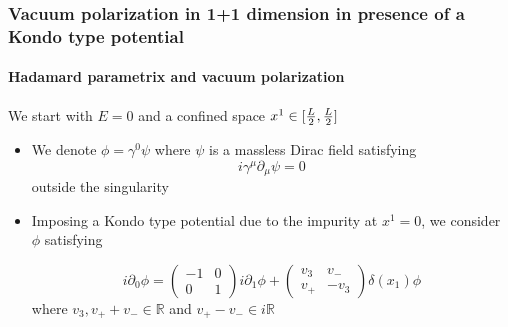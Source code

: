 \documentclass[french]{beamer}
\begin{document}
\begin{frame}[shrink=10]
\frametitle{Vacuum polarization in 1+1 dimension in presence of a Kondo type potential}
\framesubtitle{Hadamard parametrix and vacuum polarization}

We start with $E = 0$ and a confined space $x^1 \in [\-\frac L 2 , \frac L 2]$
\begin{itemize}
\item We denote $\phi = \gamma^0\psi$ where $\psi$ is a massless Dirac field satisfying 
\begin{equation*}
i\gamma^\mu\partial_\mu \psi = 0
\end{equation*}
outside the singularity
\item Imposing a Kondo type potential due to the impurity at $x^1 = 0$,
we consider $\phi$ satisfying

\begin{equation*}
i \partial_0 \phi = 
\begin{pmatrix} 
-1 & 0 \\
0 & 1 
\end{pmatrix} i \partial_1 \phi +
\begin{pmatrix}
v_3 & v_- \\
v_+ & -v_3
\end{pmatrix} \delta(x_1) \phi
\end{equation*}
where $v_3, v_+ + v_- \in \mathbb{R}$ and $ v_+ - v_-\in i \mathbb{R}$
\end{itemize}

\end{frame}
\end{document}
